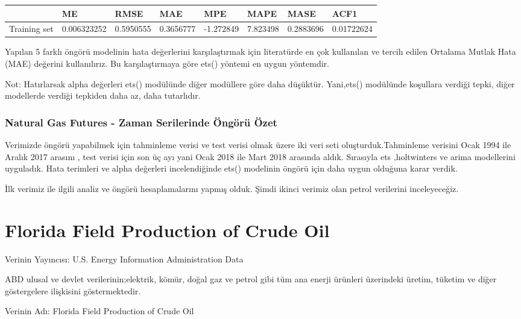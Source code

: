 \documentclass[11pt]{article}
\begin{document}
    
    \begin{tabular}{r|lllllll}
  & ME & RMSE & MAE & MPE & MAPE & MASE & ACF1\\
\hline
	Training set & 0.006323252 & 0.5950555   & 0.3656777   & -1.272849   & 7.823498    & 0.2883696   & 0.01722624 \\
\end{tabular}


    
    Yapılan 5 farklı öngörü modelinin hata değerlerini karşılaştırmak için
literatürde en çok kullanılan ve tercih edilen Ortalama Mutlak Hata
(MAE) değerini kullanılırız. Bu karşılaştırmaya göre ets() yöntemi en
uygun yöntemdir.

Not: Hatırlarsak alpha değerleri ets() modülünde diğer modüllere göre daha düşüktür. Yani,ets() modülünde koşullara verdiği
tepki, diğer modellerde verdiği tepkiden daha az, daha tutarlıdır.

    \subsubsection{Natural Gas Futures - Zaman Serilerinde Öngörü Özet}\label{natural-gas-futures---zaman-serilerinde-uxf6nguxf6ruxfc-uxf6zet}

Verimizde öngörü yapabilmek için tahminleme verisi ve test verisi olmak
üzere iki veri seti oluşturduk.Tahminleme verisini Ocak 1994 ile Aralık
2017 arasını , test verisi için son üç ayı yani Ocak 2018 ile Mart 2018
arasında aldık. Sırasıyla ets ,holtwinters ve arima modellerini
uyguladık. Hata terimleri ve alpha değerleri incelendiğinde ets()
modelinin öngörü için daha uygun olduğuna karar verdik.

    İlk verimiz ile ilgili analiz ve öngörü hesaplamalarını yapmış olduk.
Şimdi ikinci verimiz olan petrol verilerini inceleyeceğiz.

    \section{Florida Field Production of Crude
Oil}\label{florida-field-production-of-crude-oil}

Verinin Yayıncısı: U.S. Energy Information Administration Data

ABD ulusal ve devlet verilerinin;elektrik, kömür, doğal gaz ve petrol
gibi tüm ana enerji ürünleri üzerindeki üretim, tüketim ve diğer
göstergelere ilişkisini göstermektedir.

Verinin Adı: Florida Field Production of Crude Oil
\end{document}
